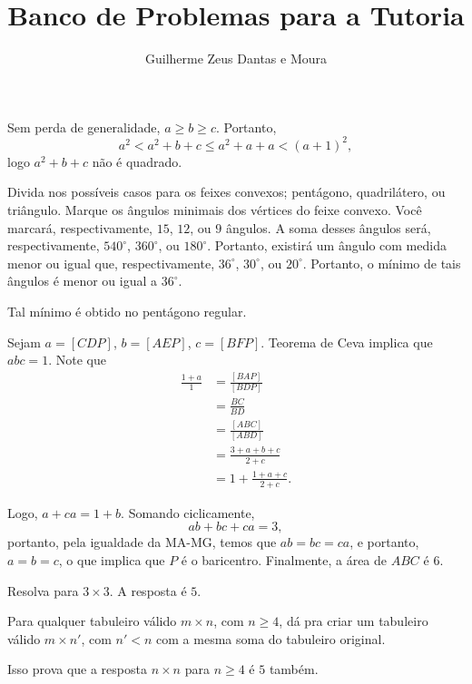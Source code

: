 \documentclass[10pt,a4paper]{scrartcl}
\title{Banco de Problemas para a Tutoria}
\author{Guilherme Zeus Dantas e Moura}
\begin{document}
	
	\zeustitle


	\begin{sol}
		Sem perda de generalidade, \(a \geq b \geq c\). Portanto, \[
			a^2 < a^2 + b + c \leq a^2 + a + a < (a+1)^2,
		\] logo \(a^2 + b + c\) não é quadrado.
	\end{sol}
	\begin{sk}
		Divida nos possíveis casos para os feixes convexos; pentágono, quadrilátero, ou triângulo.
		Marque os ângulos minimais dos vértices do feixe convexo.
		Você marcará, respectivamente, \(15\), \(12\), ou \(9\) ângulos.
		A soma desses ângulos será, respectivamente, \(540^\circ\), \(360^\circ\), ou \(180^\circ\).
		Portanto, existirá um ângulo com medida menor ou igual que, respectivamente, \(36^\circ\), \(30^\circ\), ou \(20^\circ\).
		Portanto, o mínimo de tais ângulos é menor ou igual a \(36^\circ\).

		Tal mínimo é obtido no pentágono regular.
	\end{sk}
	\begin{sol}
		Sejam \(a = [CDP]\), \(b=[AEP]\), \(c = [BFP]\). Teorema de Ceva implica que \(abc = 1\). Note que
		\begin{align*}
			\frac{1+a}{1} &= \frac{[BAP]}{[BDP]} \\
						  &= \frac{BC}{BD} \\
						  &= \frac{[ABC]}{[ABD]} \\
						  &= \frac{3 + a + b + c}{2 + c} \\
						  &= 1 + \frac{1 + a + c}{2 + c}.
		\end{align*}

		Logo, \(a + ca = 1 + b\). Somando ciclicamente, \[
			ab + bc + ca = 3,
		\]
		portanto, pela igualdade da MA-MG, temos que \(ab = bc = ca\), e portanto, \(a = b = c\), o que implica que \(P\) é o baricentro. Finalmente, a área de \(ABC\) é \(6\).
	\end{sol}
	\begin{sk}
		Resolva para \(3 \times 3\). A resposta é \(5\).

		Para qualquer tabuleiro válido \(m \times n\), com \(n \geq 4\), dá pra criar um tabuleiro válido \(m \times n'\), com \(n' < n\) com a mesma soma do tabuleiro original.

		Isso prova que a resposta \(n \times n\) para \(n \geq 4\) é \(5\) também.
	\end{sk}
\end{document}

